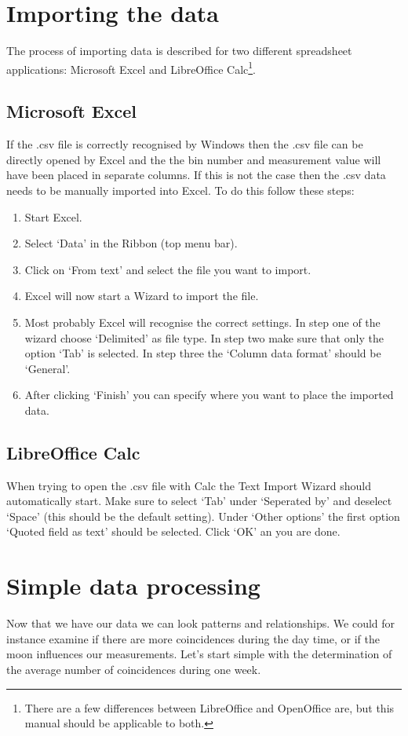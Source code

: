 \documentclass[12pt,a4paper]{article}
\numberwithin{equation}{section}
\numberwithin{figure}{section}
\numberwithin{table}{section}
\begin{document}
\section{Importing the data}
The process of importing data is described for two different spreadsheet applications: Microsoft Excel and LibreOffice Calc\footnote{There are a few differences between LibreOffice and OpenOffice are, but this manual should be applicable to both.}.

\subsection{Microsoft Excel}
If the .csv file is correctly recognised by Windows then the .csv file can be directly opened by Excel and the the bin number and measurement value will have been placed in separate columns. If this is not the case then the .csv data needs to be manually imported into Excel. To do this follow these steps:
\begin{enumerate}[1.]
\item Start Excel.
\item Select `Data' in the Ribbon (top menu bar).
\item Click on `From text' and select the file you want to import.
\item Excel will now start a Wizard to import the file.
\item Most probably Excel will recognise the correct settings. In step one of the wizard choose `Delimited' as file type. In step two make sure that only the option `Tab' is selected. In step three the `Column data format' should be `General'.
\item After clicking `Finish' you can specify where you want to place the imported data.
\end{enumerate}

\subsection{LibreOffice Calc}
When trying to open the .csv file with Calc the Text Import Wizard should automatically start. Make sure to select `Tab' under `Seperated by' and deselect `Space' (this should be the default setting). Under `Other options' the first option `Quoted field as text' should be selected. Click `OK' an you are done.

\section{Simple data processing}
Now that we have our data we can look patterns and relationships. We could for instance examine if there are more coincidences during the day time, or if the moon influences our measurements. Let's start simple with the determination of the average number of coincidences during one week.
\end{document}
